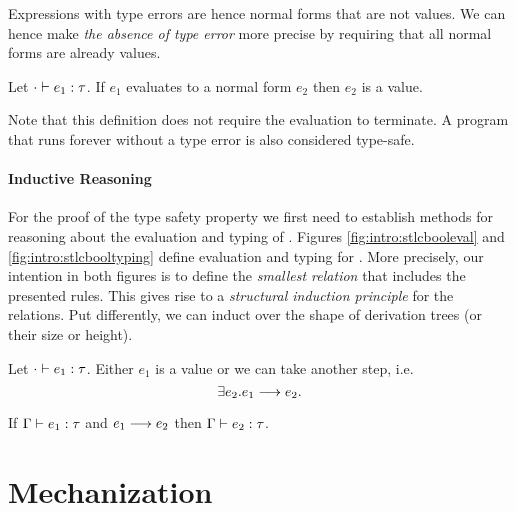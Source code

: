 {Expressions with type errors are hence normal forms that are not values. We can
hence make \emph{the absence of type error} more precise by requiring that all
normal forms are already values.

\begin{thm}
  Let ${\cdot} \vdash {e_1} : {\tau}$. If $e_1$ evaluates to a normal form $e_2$
  then $e_2$ is a value.
\end{thm}

Note that this definition does not require the evaluation to terminate.  A
program that runs forever without a type error is also considered type-safe.


\paragraph{Inductive Reasoning}
For the proof of the type safety property we first need to establish methods for
reasoning about the evaluation and typing of \stlcbool. Figures
\ref{fig:intro:stlcbooleval} and \ref{fig:intro:stlcbooltyping} define
evaluation and typing for \stlcbool. More precisely, our intention in both
figures is to define the \emph{smallest relation} that includes the presented
rules. This gives rise to a \emph{structural induction principle} for the
relations. Put differently, we can induct over the shape of derivation trees (or
their size or height).



\begin{lem}[Progress]
  Let ${\cdot} \vdash {e_1} : {\tau}$. Either $e_1$ is a value or we can take another
  step, i.e.
  \[ \exists e_2. {e_1} \longrightarrow {e_2}. \]
\end{lem}


\begin{lem}[Preservation]
  If ${\Gamma} \vdash {e_1} : {\tau}$ and ${e_1} \longrightarrow {e_2}$ then ${\Gamma} \vdash {e_2} : {\tau}$.
\end{lem}




\section{Mechanization}

}

